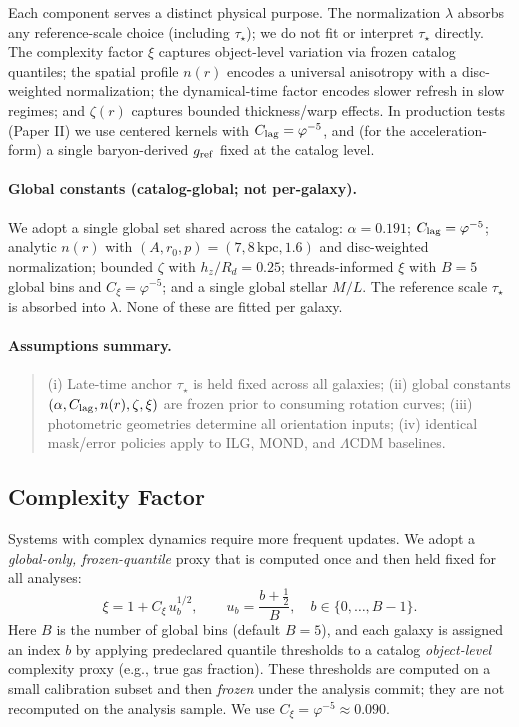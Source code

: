 \documentclass[usenatbib]{mnras}
\begin{document}
Each component serves a distinct physical purpose. The normalization $\lambda$ absorbs any reference-scale choice (including $\tau_\star$); we do not fit or interpret $\tau_\star$ directly. The complexity factor $\xi$ captures object-level variation via frozen catalog quantiles; the spatial profile $n(r)$ encodes a universal anisotropy with a disc-weighted normalization; the dynamical-time factor encodes slower refresh in slow regimes; and $\zeta(r)$ captures bounded thickness/warp effects. In production tests (Paper II) we use centered kernels with $C_{\rm lag}=\varphi^{-5}$, and (for the acceleration-form) a single baryon-derived $g_{\rm ref}$ fixed at the catalog level.

\paragraph{Global constants (catalog-global; not per-galaxy).} We adopt a single global set shared across the catalog: $\alpha=0.191$; $C_{\rm lag}=\varphi^{-5}$; analytic $n(r)$ with $(A,r_0,p)=(7,8\,\mathrm{kpc},1.6)$ and disc-weighted normalization; bounded $\zeta$ with $h_z/R_d=0.25$; threads-informed $\xi$ with $B=5$ global bins and $C_\xi=\varphi^{-5}$; and a single global stellar $M/L$. The reference scale $\tau_\star$ is absorbed into $\lambda$. None of these are fitted per galaxy.

\paragraph{Assumptions summary.}
\begin{quote}
  (i) Late-time anchor $\tau_\star$ is held fixed across all galaxies; (ii) global constants $(\alpha, C_{\rm lag}, n(r), \zeta, \xi)$ are frozen prior to consuming rotation curves; (iii) photometric geometries determine all orientation inputs; (iv) identical mask/error policies apply to ILG, MOND, and $\Lambda$CDM baselines.
\end{quote}

\subsection{Complexity Factor}

Systems with complex dynamics require more frequent updates. We adopt a \emph{global-only, frozen-quantile} proxy that is computed once and then held fixed for all analyses:
\begin{equation}
\xi = 1 + C_\xi\, u_b^{1/2}, \qquad u_b = \frac{b+\tfrac{1}{2}}{B},\quad b\in\{0,\dots,B{-}1\}.
\end{equation}
Here $B$ is the number of global bins (default $B{=}5$), and each galaxy is assigned an index $b$ by applying predeclared quantile thresholds to a catalog \emph{object-level} complexity proxy (e.g., true gas fraction). These thresholds are computed on a small calibration subset and then \emph{frozen} under the analysis commit; they are not recomputed on the analysis sample. We use $C_\xi = \varphi^{-5} \approx 0.090$.
\end{document}
